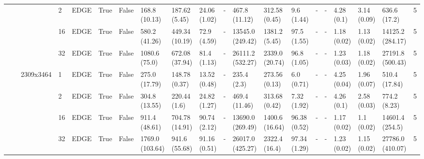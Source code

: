 \begin{tabular}{lllllllllllllllllllr}
                  &      &           & 2  & EDGE & True &  False &                 168.8 (10.13) &                187.62 (5.45) &             24.06 (1.02) &              - &             467.8 (11.12) &            312.58 (0.45) &           9.6 (1.44) &                - &             - &               4.28 (0.1) &          3.14 (0.09) &       636.6 (17.2) &      5 \\
                  &      &           & 16 & EDGE & True &  False &                 580.2 (41.26) &               449.34 (10.19) &              72.9 (4.59) &              - &          13545.0 (249.42) &            1381.2 (5.45) &          97.5 (1.55) &                - &             - &              1.18 (0.02) &          1.13 (0.02) &   14125.2 (284.17) &      5 \\
                  &      &           & 32 & EDGE & True &  False &                 1080.6 (75.0) &               672.08 (37.94) &              81.4 (1.13) &              - &          26111.2 (532.27) &           2339.0 (20.74) &          96.8 (1.05) &                - &             - &              1.23 (0.03) &          1.18 (0.02) &   27191.8 (500.43) &      5 \\
                  &      & 2309x3464 & 1  & EDGE & True &  False &                 275.0 (17.79) &                148.78 (0.37) &             13.52 (0.48) &              - &               235.4 (2.3) &            273.56 (0.13) &           6.0 (0.71) &                - &             - &              4.25 (0.04) &          1.96 (0.07) &      510.4 (17.84) &      5 \\
                  &      &           & 2  & EDGE & True &  False &                 304.8 (13.55) &                 220.44 (1.6) &             24.82 (1.27) &              - &             469.4 (11.46) &            313.68 (0.42) &          7.32 (1.92) &                - &             - &               4.26 (0.1) &          2.58 (0.03) &       774.2 (8.23) &      5 \\
                  &      &           & 16 & EDGE & True &  False &                 911.4 (48.61) &               704.78 (14.91) &             90.74 (2.12) &              - &          13690.0 (269.49) &           1400.6 (16.64) &         96.38 (0.52) &                - &             - &              1.17 (0.02) &           1.1 (0.02) &    14601.4 (254.5) &      5 \\
                  &      &           & 32 & EDGE & True &  False &               1769.0 (103.64) &                941.6 (55.68) &             91.16 (0.51) &              - &          26017.0 (425.27) &            2322.4 (16.4) &         97.34 (1.29) &                - &             - &              1.23 (0.02) &          1.15 (0.02) &   27786.0 (410.07) &      5 \\

\end{tabular}
